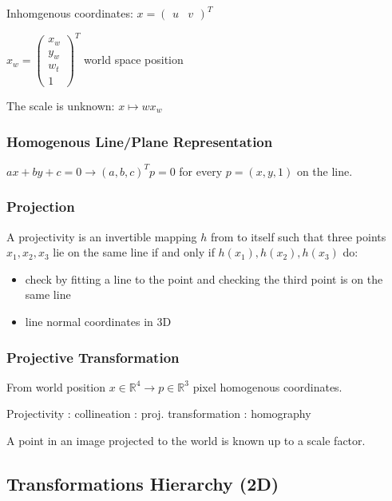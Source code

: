 Inhomgenous coordinates: $x = (\begin{matrix} u & v \end{matrix})^T $

$ x_w = \left( \begin{matrix} x_w \\  y_w \\ w_t\\  1 \end{matrix} \right)^T $ world space position

The scale is unknown: $x \mapsto  w x_w$

\subsubsection{Homogenous Line/Plane Representation}

$ax+by+c = 0 \to (a,b,c)^T p = 0$ for every $p = (x,y,1)$ on the line.

\subsubsection{Projection}

A projectivity is an invertible mapping $h$ from  to itself such that three points $x_1 , x_2 , x_3$ lie on the same line if and only if $h(x_1), h(x_2 ), h(x_3)$ do:

\begin{itemize}
\item check by fitting a line to the point and checking the third point is on the same line
\item line normal coordinates in 3D
\end{itemize}

\subsubsection{Projective Transformation}

From world position $x \in \mathbb{R}^4 \to p \in \mathbb R^3$ pixel homogenous coordinates. 

Projectivity : collineation :  proj. transformation : homography

A point in an image projected to the world is known up to a scale factor.

\subsection{Transformations Hierarchy (2D)}

